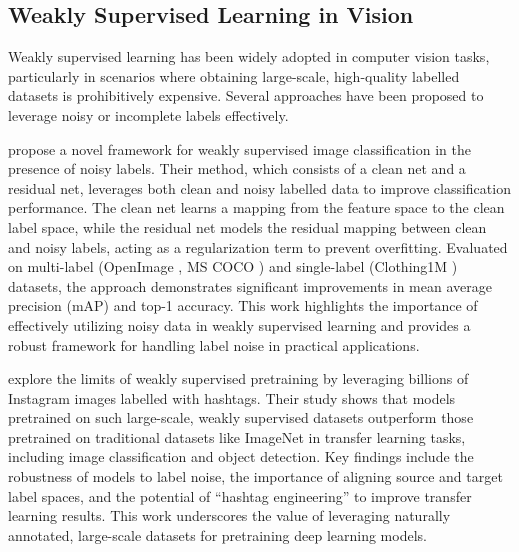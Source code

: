 \subsection{Weakly Supervised Learning in Vision}

Weakly supervised learning has been widely adopted in computer vision tasks, particularly in scenarios where obtaining large-scale, high-quality labelled datasets is prohibitively expensive. Several approaches have been proposed to leverage noisy or incomplete labels effectively.
\newline

\citet{hu_weakly_2019} propose a novel framework for weakly supervised image classification in the presence of noisy labels. Their method, which consists of a clean net and a residual net, leverages both clean and noisy labelled data to improve classification performance. The clean net learns a mapping from the feature space to the clean label space, while the residual net models the residual mapping between clean and noisy labels, acting as a regularization term to prevent overfitting. Evaluated on multi-label (OpenImage \cite{openimages}, MS COCO \cite{lin2015microsoftcococommonobjects}) and single-label (Clothing1M \cite{7298885}) datasets, the approach demonstrates significant improvements in mean average precision (mAP) and top-1 accuracy. This work highlights the importance of effectively utilizing noisy data in weakly supervised learning and provides a robust framework for handling label noise in practical applications.
\newline

\citet{mahajan_exploring_2018} explore the limits of weakly supervised pretraining by leveraging billions of Instagram images labelled with hashtags. Their study shows that models pretrained on such large-scale, weakly supervised datasets outperform those pretrained on traditional datasets like ImageNet in transfer learning tasks, including image classification and object detection. Key findings include the robustness of models to label noise, the importance of aligning source and target label spaces, and the potential of ``hashtag engineering'' to improve transfer learning results. This work underscores the value of leveraging naturally annotated, large-scale datasets for pretraining deep learning models.
\newline

